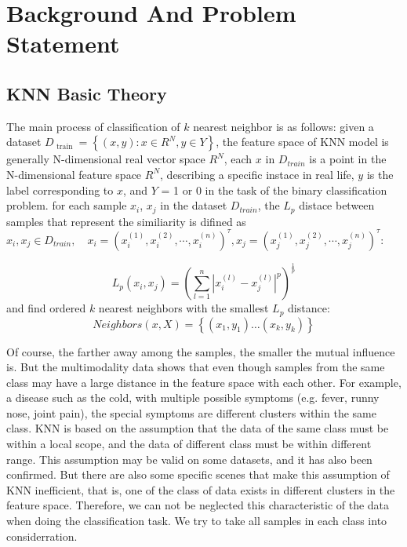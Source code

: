 \documentclass{ieeeaccess}
\begin{document}
\section{Background And Problem Statement}
\subsection{KNN Basic Theory}
The main process of classification of $k$ nearest neighbor is as follows:
given a dataset $D_{\text { train }}=\left\{(x, y) : x \in R^{N}, y \in Y\right\}$, the feature space of KNN model is generally N-dimensional real vector space $R^{N}$,
each $x$ in $D_{train}$ is a point in the N-dimensional feature space $R^{N}$, describing a specific instace in real life, $y$ is the label corresponding to $x$, and $Y$ = 1 or 0 in the task of the binary classification problem. 
for each sample $x_{i}$, $x_{j}$ in the dataset $D_{train}$, the $L_{p}$ distace between samples that represent the similiarity is difined as $x_{i}, x_{j} \in D_{train}, \quad x_{i}=\left(x_{i}^{(1)}, x_{i}^{(2)}, \cdots, x_{i}^{(n)}\right)^{\tau}, x_{j}=\left(x_{j}^{(1)}, x_{j}^{(2)}, \cdots, x_{j}^{(n)}\right)^{\tau}$:

\begin{equation}
L_{p}\left(x_{i}, x_{j}\right)=\left(\sum_{l=1}^{n}\left|x_{i}^{(l)}-x_{j}^{(l)}\right|^{p}\right)^{\frac{1}{p}}
\end{equation}
and find ordered $k$ nearest neighbors with the smallest $L_{p}$ distance:
\begin{equation}
Neighbors(x, X)=\left\{\left(x_{1}, y_{1}\right) \ldots\left(x_{k}, y_{k}\right)\right\}
\end{equation}


Of course, the farther away among the samples, the smaller the mutual influence is. But the multimodality data shows that even though samples from the same class may have a large distance in the feature space with each other. For example, a disease such as the cold, with multiple possible symptoms (e.g. fever, runny nose, joint pain), the special symptoms are different clusters within the same class. KNN is based on the assumption that the data of the same class must be within a local scope, and the data of different class must be within different range. This assumption may be valid on some datasets, and it has also been confirmed. But there are also some specific scenes that make this assumption of KNN inefficient, that is, one of the class of data exists in different clusters in the feature space. Therefore, we can not be neglected this characteristic of the data when doing the classification task. We try to take all samples in each class into considerration.	
\end{document}
